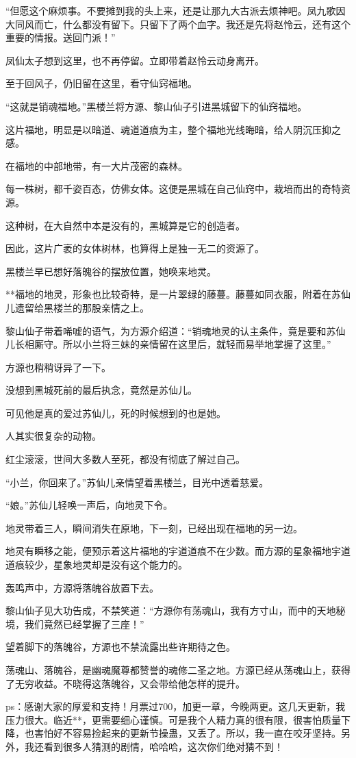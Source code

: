 \begin{this_body}
“但愿这个麻烦事。不要摊到我的头上来，还是让那九大古派去烦神吧。凤九歌因大同风而亡，什么都没有留下。只留下了两个血字。我还是先将赵怜云，还有这个重要的情报。送回门派！”

凤仙太子想到这里，也不再停留。立即带着赵怜云动身离开。

至于回风子，仍旧留在这里，看守仙窍福地。

“这就是销魂福地。”黑楼兰将方源、黎山仙子引进黑城留下的仙窍福地。

这片福地，明显是以暗道、魂道道痕为主，整个福地光线晦暗，给人阴沉压抑之感。

在福地的中部地带，有一大片茂密的森林。

每一株树，都千姿百态，仿佛女体。这便是黑城在自己仙窍中，栽培而出的奇特资源。

这种树，在大自然中本是没有的，黑城算是它的创造者。

因此，这片广袤的女体树林，也算得上是独一无二的资源了。

黑楼兰早已想好落魄谷的摆放位置，她唤来地灵。

**福地的地灵，形象也比较奇特，是一片翠绿的藤蔓。藤蔓如同衣服，附着在苏仙儿遗留给黑楼兰的那股亲情之上。

黎山仙子带着唏嘘的语气，为方源介绍道：“销魂地灵的认主条件，竟是要和苏仙儿长相厮守。所以小兰将三妹的亲情留在这里后，就轻而易举地掌握了这里。”

方源也稍稍讶异了一下。

没想到黑城死前的最后执念，竟然是苏仙儿。

可见他是真的爱过苏仙儿，死的时候想到的也是她。

人其实很复杂的动物。

红尘滚滚，世间大多数人至死，都没有彻底了解过自己。

“小兰，你回来了。”苏仙儿亲情望着黑楼兰，目光中透着慈爱。

“娘。”苏仙儿轻唤一声后，向地灵下令。

地灵带着三人，瞬间消失在原地，下一刻，已经出现在福地的另一边。

地灵有瞬移之能，便预示着这片福地的宇道道痕不在少数。而方源的星象福地宇道道痕较少，星象地灵却是没有这个能力的。

轰鸣声中，方源将落魄谷放置下去。

黎山仙子见大功告成，不禁笑道：“方源你有荡魂山，我有方寸山，而中的天地秘境，我们竟然已经掌握了三座！”

望着脚下的落魄谷，方源也不禁流露出些许期待之色。

荡魂山、落魄谷，是幽魂魔尊都赞誉的魂修二圣之地。方源已经从荡魂山上，获得了无穷收益。不晓得这落魄谷，又会带给他怎样的提升。

ps：感谢大家的厚爱和支持！月票过700，加更一章，今晚两更。这几天更新，我压力很大。临近**，更需要细心谨慎。可是我个人精力真的很有限，很害怕质量下降，也害怕好不容易捡起来的更新节操蛊，又丢了。所以，我一直在咬牙坚持。另外，我还看到很多人猜测的剧情，哈哈哈，这次你们绝对猜不到！

\end{this_body}

